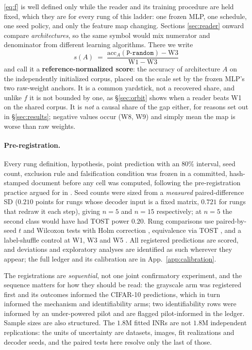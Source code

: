 \eqref{eq:f} is well defined only while the reader and its training procedure are held fixed, which
they are for every rung of this ladder: one frozen MLP, one schedule, one seed policy, and only the
feature map changing. Sections \ref{sec:reader} onward compare \emph{architectures}, so the same
symbol would mix numerator and denominator from different learning algorithms. There we write
\begin{equation}
s(A) \;=\; \frac{\mathrm{acc}_A(\texttt{P-random}) - \mathrm{W3}}{\mathrm{W1} - \mathrm{W3}}
\label{eq:s}
\end{equation}
and call it a \textbf{reference-normalized score}: the accuracy of architecture $A$ on the
independently initialized corpus, placed on the scale set by the frozen MLP's two raw-weight
anchors. It is a common yardstick, not a recovered share, and unlike $f$ it is not bounded by one,
as \S\ref{sec:orbit} shows when a reader beats W1 on the shared corpus. It is \emph{not} a causal
share of the gap either, for
reasons set out in \S\ref{sec:results}; negative values occur (W8, W9) and simply mean the map is
worse than raw weights.

\paragraph{Pre-registration.} Every rung definition, hypothesis, point prediction with an $80\%$
interval, seed count, exclusion rule and falsification condition was frozen in a committed,
hash-stamped document before any cell was computed, following the pre-registration practice
argued for in \citep{munafo2017manifesto,nosek2018preregistration}. Seed counts were sized from a
\emph{measured} paired-difference SD ($0.210$ points for rungs whose decoder input is a fixed
matrix, $0.721$ for rungs that redraw it each step), giving $n=5$ and $n=15$ respectively;
at $n=5$ the second class would have had TOST power $0.20$. Rung comparisons use paired-by-seed
$t$ and Wilcoxon tests with Holm correction \citep{holm1979simple}, equivalence via TOST
\citep{schuirmann1987tost}, and a label-shuffle control at W1, W3 and W5
\citep{zhang2017rethinking}. All registered predictions are scored, and deviations and exploratory
analyses are identified as such wherever they appear; the full ledger and its calibration are in
App.~\ref{app:calibration}.

The registrations are \emph{sequential}, not one joint confirmatory experiment, and the sequence
matters for how they should be read: the grayscale arm was registered first and its outcomes
informed the CIFAR-10 predictions, which in turn informed the mechanism and identifiability arms;
two identifiability rows were informed by an under-powered pilot and are flagged pilot-informed in
the ledger. Sample sizes are also structured. The $1.8$M fitted INRs are not $1.8$M independent
replications: the units of uncertainty are datasets, images, fit realizations and decoder seeds,
and the paired tests here resolve only the last of those.


